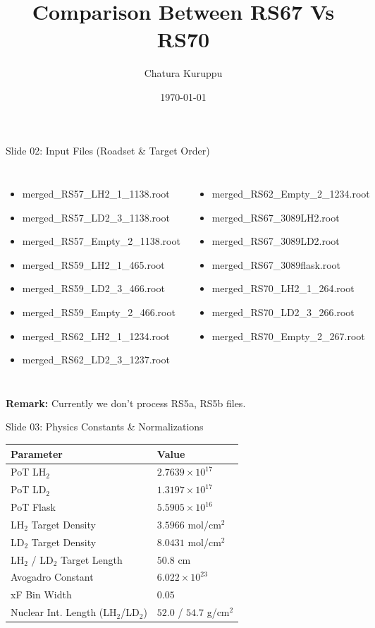 \documentclass[aspectratio=169]{beamer}
\title{Comparison Between RS67 Vs RS70}
\author{Chatura Kuruppu}
\date{\today}
\begin{document}
\begin{frame}
\titlepage
\end{frame}
\begin{frame}{Slide 02: Input Files (Roadset \& Target Order)}
\begin{columns}
\tiny\begin{itemize}
\item merged\_RS57\_LH2\_1\_1138.root
\item merged\_RS57\_LD2\_3\_1138.root
\item merged\_RS57\_Empty\_2\_1138.root
\item merged\_RS59\_LH2\_1\_465.root
\item merged\_RS59\_LD2\_3\_466.root
\item merged\_RS59\_Empty\_2\_466.root
\item merged\_RS62\_LH2\_1\_1234.root
\item merged\_RS62\_LD2\_3\_1237.root
\end{itemize}\tiny\begin{itemize}
\item merged\_RS62\_Empty\_2\_1234.root
\item merged\_RS67\_3089LH2.root
\item merged\_RS67\_3089LD2.root
\item merged\_RS67\_3089flask.root
\item merged\_RS70\_LH2\_1\_264.root
\item merged\_RS70\_LD2\_3\_266.root
\item merged\_RS70\_Empty\_2\_267.root
\end{itemize}\end{columns}
\vspace{0.3cm}\centering\small\textbf{Remark:} Currently we don't process RS5a, RS5b files.
\end{frame}
\begin{frame}{Slide 03: Physics Constants \& Normalizations}
\centering\footnotesize
\begin{tabular}{ll}
\toprule \textbf{Parameter} & \textbf{Value} \\ \midrule
PoT LH$_2$ & $2.7639 \times 10^{17}$ \\
PoT LD$_2$ & $1.3197 \times 10^{17}$ \\
PoT Flask & $5.5905 \times 10^{16}$ \\
LH$_2$ Target Density & $3.5966$ mol/cm$^2$ \\
LD$_2$ Target Density & $8.0431$ mol/cm$^2$ \\
LH$_2$ / LD$_2$ Target Length & $50.8$ cm \\
Avogadro Constant & $6.022 \times 10^{23}$ \\
xF Bin Width & $0.05$ \\
Nuclear Int. Length (LH$_2$/LD$_2$) & $52.0$ / $54.7$ g/cm$^2$ \\
\bottomrule \end{tabular}
\end{frame}
\end{document}
